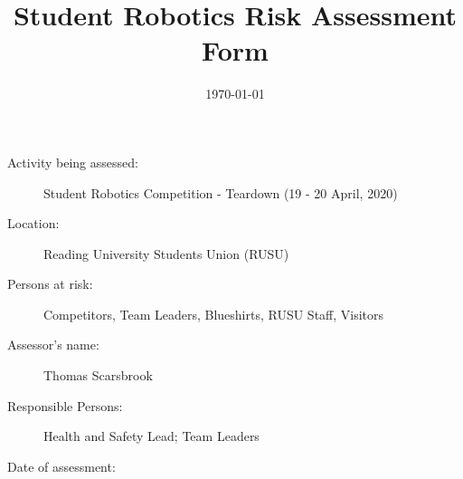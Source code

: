 \documentclass[12pt,a4paper]{scrartcl}
\title{Student Robotics Risk Assessment Form}
\begin{document}
\maketitle

\begin{description}
\item[Activity being assessed:] Student Robotics Competition - Teardown (19 - 20 April, 2020)
\item[Location:] Reading University Students Union (RUSU)
\item[Persons at risk:] Competitors, Team Leaders, Blueshirts, RUSU Staff, Visitors
\end{description}

\begin{description}
\item[Assessor's name:] Thomas Scarsbrook
\item[Responsible Persons:] Health and Safety Lead; Team Leaders
\item[Date of assessment:] \date{\today}
\end{description}
\clearpage

\newcommand{\risk}[4]{
 #1 & #2 & #3 & #4 \\
}
\end{document}
